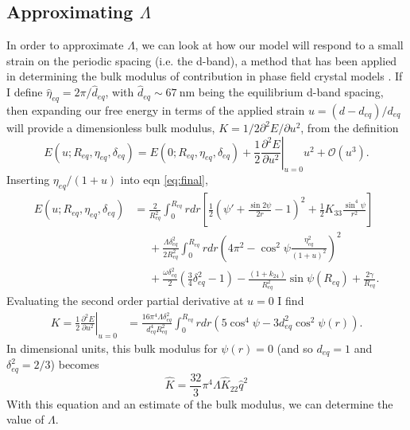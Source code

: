 \documentclass[12pt]{article}
\begin{document}
\subsection{Approximating $\Lambda$}
In order to approximate $\Lambda$, we can look at how our model will respond to a small strain on the periodic spacing (i.e. the d-band), a method that has been applied in determining the bulk modulus of contribution in phase field crystal models \cite{Elder:2004ct}. If I define $\hat{\eta}_{eq}=2\pi/\hat{d}_{eq}$, with $\hat{d}_{eq}\sim\SI{67}{\nano\meter}$ being the equilibrium d-band spacing, then expanding our free energy in terms of the applied strain $u=(d-d_{eq})/d_{eq}$ will provide a dimensionless bulk modulus, $K=1/2\partial^2E/\partial u^2$, from the definition
\begin{equation}\label{eq:strain_taylor}
E(u;R_{eq},\eta_{eq},\delta_{eq})=E(0;R_{eq},\eta_{eq},\delta_{eq})+\frac{1}{2}\left.\frac{\partial^2E}{\partial u^2}\right|_{u=0}\!\!\!\!\!\!\!\!\!u^2+\mathcal{O}(u^3).
\end{equation}
Inserting $\eta_{eq}/(1+u)$ into eqn \ref{eq:final},
\begin{align}\label{eq:fe_strain}
E(u;R_{eq},\eta_{eq},\delta_{eq})&=\frac{2}{R_{eq}^2}\int_0^{R_{eq}}rdr\left[\frac{1}{2}\left(\psi'+\frac{\sin2\psi}{2r}-1\right)^2+\frac{1}{2}K_{33}\frac{\sin^4\psi}{r^2}\right]\nonumber\\
&\phantom{=}+\frac{\Lambda\delta_{eq}^2}{2R_{eq}^2}\int_0^{R_{eq}}rdr\left(4\pi^2-\cos^2\psi\frac{\eta_{eq}^2}{(1+u)^2}\right)^2\nonumber\\
&\phantom{=}+\frac{\omega\delta_{eq}^2}{2}\left(\frac{3}{4}\delta_{eq}^2-1\right)-\frac{(1+k_{24})}{R_{eq}^2}\sin\psi(R_{eq})+\frac{2\gamma}{R_{eq}}.
\end{align}
Evaluating the second order partial derivative at $u=0$ I find
\begin{align}
K=\frac{1}{2}\left.\frac{\partial^2E}{\partial u^2}\right|_{u=0} &=\frac{16\pi^4\Lambda\delta_{eq}^2}{d_{eq}^4R_{eq}^2}\int_0^{R_{eq}}rdr\left(5\cos^4{\psi}-3d_{eq}^2\cos^2\psi(r)\right).
\end{align}
In dimensional units, this bulk modulus for $\psi(r)=0$ (and so $d_{eq}=1$ and $\delta_{eq}^2=2/3$) becomes
\begin{equation}\label{eq:bulk_dimensional}
\hat{K}=\frac{32}{3}\pi^4\Lambda \hat{K}_{22}\hat{q}^2
\end{equation}
With this equation and an estimate of the bulk modulus, we can determine the value of $\Lambda$.
\end{document}
